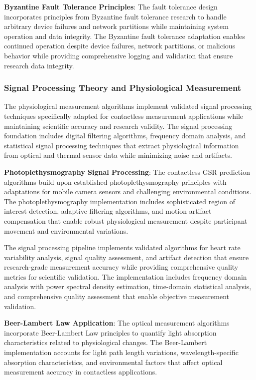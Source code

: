 \documentclass[11pt,a4paper]{report}
\begin{document}
\textbf{Byzantine Fault Tolerance Principles}: The fault tolerance design incorporates principles from Byzantine fault
tolerance research to handle arbitrary device failures and network partitions while maintaining system operation and
data integrity. The Byzantine fault tolerance adaptation enables continued operation despite device failures, network
partitions, or malicious behavior while providing comprehensive logging and validation that ensure research data
integrity.

\subsubsection{Signal Processing Theory and Physiological Measurement}

The physiological measurement algorithms implement validated signal processing techniques specifically adapted for
contactless measurement applications while maintaining scientific accuracy and research validity. The signal processing
foundation includes digital filtering algorithms, frequency domain analysis, and statistical signal processing
techniques that extract physiological information from optical and thermal sensor data while minimizing noise and
artifacts.

\textbf{Photoplethysmography Signal Processing}: The contactless GSR prediction algorithms build upon established
photoplethysmography principles with adaptations for mobile camera sensors and challenging environmental conditions. The
photoplethysmography implementation includes sophisticated region of interest detection, adaptive filtering algorithms,
and motion artifact compensation that enable robust physiological measurement despite participant movement and
environmental variations.

The signal processing pipeline implements validated algorithms for heart rate variability analysis, signal quality
assessment, and artifact detection that ensure research-grade measurement accuracy while providing comprehensive quality
metrics for scientific validation. The implementation includes frequency domain analysis with power spectral density
estimation, time-domain statistical analysis, and comprehensive quality assessment that enable objective measurement
validation.

\textbf{Beer-Lambert Law Application}: The optical measurement algorithms incorporate Beer-Lambert Law principles to quantify
light absorption characteristics related to physiological changes. The Beer-Lambert implementation accounts for light
path length variations, wavelength-specific absorption characteristics, and environmental factors that affect optical
measurement accuracy in contactless applications.
\end{document}
